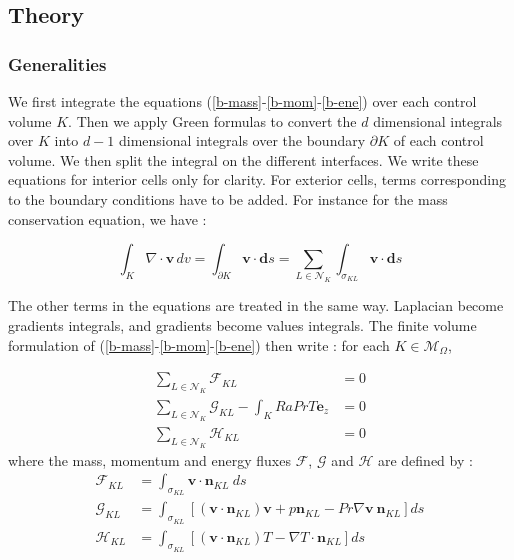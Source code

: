 \documentclass[12pt]{article}
\newcommand{\vb}[1]{\ensuremath{\boldsymbol #1}}
\begin{document}
\subsection{Theory}
\subsubsection{Generalities}
We first integrate the equations
(\ref{b-mass}-\ref{b-mom}-\ref{b-ene}) over each control volume
$K$. Then we apply Green formulas to convert the $d$ dimensional
integrals over $K$ into $d-1$ dimensional integrals over the boundary
$\partial K$ of each control volume. We then split the integral on the
different interfaces. We write these equations for interior cells only
for clarity. For exterior cells, terms corresponding to the boundary
conditions have to be added. For instance for the mass conservation
equation, we have :

\begin{equation}
  \int_K \nabla \cdot \vb{v} \, dv = \int_{\partial K} \vb v \cdot \vb{ds} =
  \sum_{L \in \mathcal{N}_K} \int_{\sigma_{KL}} \vb{v} \cdot \vb{ds}
\end{equation}

The other terms in the equations are treated in the same
way. Laplacian become gradients integrals, and gradients become values
integrals. The finite volume formulation of
(\ref{b-mass}-\ref{b-mom}-\ref{b-ene}) then write : for each $K \in
\mathcal M_\Omega$,

\begin{align}
  \sum_{L \in \mathcal{N}_K} \mathcal{F}_{KL} &= 0\\
  \sum_{L \in \mathcal{N}_K} \mathcal{G}_{KL} - \int_{K} Ra Pr T
  \vb{e_{z}} &= 0 \\
  \sum_{L \in \mathcal{N}_K} \mathcal{H}_{KL} &= 0
\end{align}
where the mass, momentum and energy fluxes $\mathcal{F}$,
$\mathcal{G}$ and $\mathcal{H}$ are defined by :
\begin{align}
  \mathcal{F}_{KL} &= \int_{\sigma_{KL}} \vb{v} \cdot \vb{n}_{KL} \ ds \\
  \mathcal{G}_{KL} &= \int_{\sigma_{KL}} \left[
    (\vb{v} \cdot \vb{n}_{KL}) \vb{v} +
    p \vb{n}_{KL} -
    Pr \nabla \vb{v} \ \vb{n}_{KL}
  \right] ds \\
  \mathcal{H}_{KL} &= \int_{\sigma_{KL}} \left[
    (\vb v \cdot \vb{n}_{KL}) T -
    \nabla T \cdot \vb{n}_{KL}
    \right] ds
\end{align}
\end{document}
